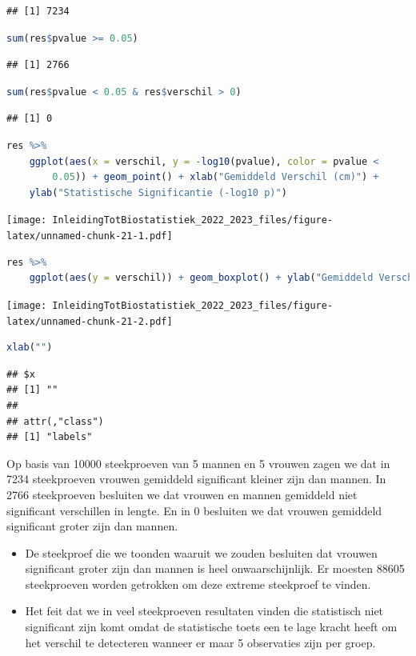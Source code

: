 \documentclass[
  12pt,dutch,coursenotes]{book}
\begin{document}
\begin{lstlisting}
## [1] 7234
\end{lstlisting}

\begin{lstlisting}[language=R]
sum(res$pvalue >= 0.05)
\end{lstlisting}

\begin{lstlisting}
## [1] 2766
\end{lstlisting}

\begin{lstlisting}[language=R]
sum(res$pvalue < 0.05 & res$verschil > 0)
\end{lstlisting}

\begin{lstlisting}
## [1] 0
\end{lstlisting}

\begin{lstlisting}[language=R]
res %>%
    ggplot(aes(x = verschil, y = -log10(pvalue), color = pvalue <
        0.05)) + geom_point() + xlab("Gemiddeld Verschil (cm)") +
    ylab("Statistische Significantie (-log10 p)")
\end{lstlisting}

\texttt{[image: InleidingTotBiostatistiek\_2022\_2023\_files/figure-latex/unnamed-chunk-21-1.pdf]}

\begin{lstlisting}[language=R]
res %>%
    ggplot(aes(y = verschil)) + geom_boxplot() + ylab("Gemiddeld Verschil (cm)")
\end{lstlisting}

\texttt{[image: InleidingTotBiostatistiek\_2022\_2023\_files/figure-latex/unnamed-chunk-21-2.pdf]}

\begin{lstlisting}[language=R]
xlab("")
\end{lstlisting}

\begin{lstlisting}
## $x
## [1] ""
## 
## attr(,"class")
## [1] "labels"
\end{lstlisting}

Op basis van 10000 steekproeven van 5 mannen en 5 vrouwen zagen we dat in 7234 steekproeven vrouwen gemiddeld significant kleiner zijn dan mannen. In 2766 steekproeven besluiten we dat vrouwen en mannen gemiddeld niet significant verschillen in lengte. En in 0 besluiten we dat vrouwen gemiddeld significant groter zijn dan mannen.

\begin{itemize}
\item
  De steekproef die we toonden waaruit we zouden besluiten dat vrouwen significant groter zijn dan mannen is heel onwaarschijnlijk. Er moesten 88605 steekproeven worden getrokken om deze extreme steekproef te vinden.
\item
  Het feit dat we in veel steekproeven resultaten vinden die statistisch niet significant zijn komt omdat de statistische toets een te lage kracht heeft om het verschil te detecteren wanneer er maar 5 observaties zijn per groep.
\end{itemize}
\end{document}
